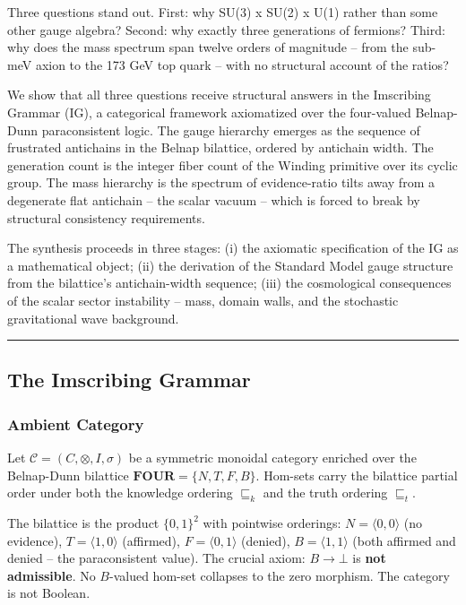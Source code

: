\documentclass[12pt,a4paper]{article}
\begin{document}
Three questions stand out. First: why SU(3) x SU(2) x U(1) rather than
some other gauge algebra? Second: why exactly three generations of
fermions? Third: why does the mass spectrum span twelve orders of
magnitude -- from the sub-meV axion to the 173 GeV top quark -- with no
structural account of the ratios?

We show that all three questions receive structural answers in the
Imscribing Grammar (IG), a categorical framework axiomatized over the
four-valued Belnap-Dunn paraconsistent logic. The gauge hierarchy
emerges as the sequence of frustrated antichains in the Belnap
bilattice, ordered by antichain width. The generation count is the
integer fiber count of the Winding primitive over its cyclic group. The
mass hierarchy is the spectrum of evidence-ratio tilts away from a
degenerate flat antichain -- the scalar vacuum -- which is forced to
break by structural consistency requirements.

The synthesis proceeds in three stages: (i) the axiomatic specification
of the IG as a mathematical object; (ii) the derivation of the Standard
Model gauge structure from the bilattice's antichain-width sequence;
(iii) the cosmological consequences of the scalar sector instability --
mass, domain walls, and the stochastic gravitational wave background.

\begin{center}\rule{0.5\linewidth}{0.5pt}\end{center}

\hypertarget{the-imscribing-grammar}{%
\subsection{The Imscribing Grammar}\label{the-imscribing-grammar}}

\hypertarget{ambient-category}{%
\subsubsection{Ambient Category}\label{ambient-category}}

Let \(\mathcal{C} = (C, \otimes, I, \sigma)\) be a symmetric monoidal
category enriched over the Belnap-Dunn bilattice
\(\mathbf{FOUR} = \{N, T, F, B\}\). Hom-sets carry the bilattice partial
order under both the knowledge ordering \(\sqsubseteq_k\) and the truth
ordering \(\sqsubseteq_t\).

The bilattice is the product \(\{0,1\}^2\) with pointwise orderings:
\(N = \langle 0,0 \rangle\) (no evidence), \(T = \langle 1,0 \rangle\)
(affirmed), \(F = \langle 0,1 \rangle\) (denied),
\(B = \langle 1,1 \rangle\) (both affirmed and denied -- the
paraconsistent value). The crucial axiom: \(B \to \bot\) is \textbf{not
admissible}. No \(B\)-valued hom-set collapses to the zero morphism. The
category is not Boolean.
\end{document}
